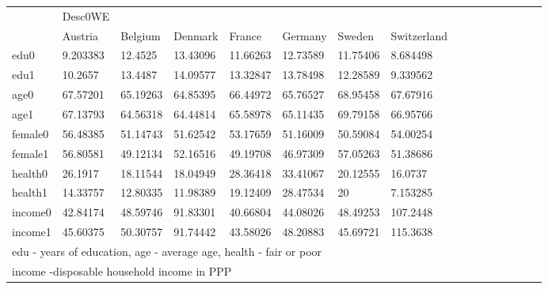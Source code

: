 \begin{tabular}{llllllllllllllll} \hline\hline
            &     Desc0WE&            &            &            &            &            &            \\
            &     Austria&     Belgium&     Denmark&      France&     Germany&      Sweden& Switzerland\\
\hline
edu0        &    9.203383&     12.4525&    13.43096&    11.66263&    12.73589&    11.75406&    8.684498\\
edu1        &     10.2657&     13.4487&    14.09577&    13.32847&    13.78498&    12.28589&    9.339562\\
age0        &    67.57201&    65.19263&    64.85395&    66.44972&    65.76527&    68.95458&    67.67916\\
age1        &    67.13793&    64.56318&    64.44814&    65.58978&    65.11435&    69.79158&    66.95766\\
female0     &    56.48385&    51.14743&    51.62542&    53.17659&    51.16009&    50.59084&    54.00254\\
female1     &    56.80581&    49.12134&    52.16516&    49.19708&    46.97309&    57.05263&    51.38686\\
health0     &     26.1917&    18.11544&    18.04949&    28.36418&    33.41067&    20.12555&     16.0737\\
health1     &    14.33757&    12.80335&    11.98389&    19.12409&    28.47534&          20&    7.153285\\
income0     &    42.84174&    48.59746&    91.83301&    40.66804&    44.08026&    48.49253&    107.2448\\
income1     &    45.60375&    50.30757&    91.74442&    43.58026&    48.20883&    45.69721&    115.3638\\
\hline\hline
\multicolumn{8}{l}{\footnotesize edu - years of education, age - average age, health - fair or poor}\\
\multicolumn{8}{l}{\footnotesize income -disposable household income in PPP}\\
\end{tabular}
